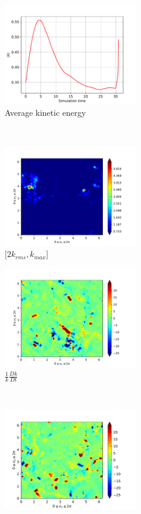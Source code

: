 \begin{figure}[H]
    \begin{subfigure}[H]{0.45\textwidth}
        \includegraphics[height=1.75in]{media/run-cds-65/ke-average1440}
        \caption{Average kinetic energy}
    \end{subfigure}
    ~
    \begin{subfigure}[H]{0.45\textwidth}
        \includegraphics[height=1.75in]{media/run-cds-65/ke-2-1440}
        \caption{$[2k_{rms}, k_{max} $] }
    \end{subfigure}
    \newline
    \begin{subfigure}[H]{0.45\textwidth}
        \includegraphics[height=1.75in]{media/run-cds-65/ke-1440}
        \caption{$\frac{1}{k} \frac{D k}{Dt}$}
    \end{subfigure}
    ~
    \begin{subfigure}{0.45\textwidth}
        \includegraphics[height=1.75in]{media/run-cds-65/A-ke-1440}

\end{subfigure}
\end{figure}
